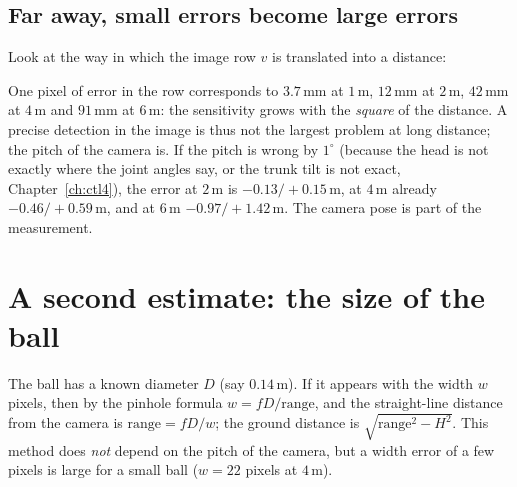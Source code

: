 \subsection*{Far away, small errors become large errors}
Look at the way in which the image row $v$ is translated into a distance:
\begin{center}
\end{center}
One pixel of error in the row corresponds to $3.7$\,mm at $1$\,m, $12$\,mm at $2$\,m, $42$\,mm at $4$\,m and $91$\,mm at $6$\,m: the sensitivity grows with the \emph{square} of the distance. A precise detection in the image is thus not the largest problem at long distance; the pitch of the camera is. If the pitch is wrong by $1^{\circ}$ (because the head is not exactly where the joint angles say, or the trunk tilt is not exact, Chapter~\ref{ch:ctl4}), the error at $2$\,m is $-0.13/+0.15$\,m, at $4$\,m already $-0.46/+0.59$\,m, and at $6$\,m $-0.97/+1.42$\,m. The camera pose is part of the measurement.

\section*{A second estimate: the size of the ball}
The ball has a known diameter $D$ (say $0.14$\,m). If it appears with the width $w$ pixels, then by the pinhole formula $w=fD/\text{range}$, and the straight-line distance from the camera is $\text{range}=fD/w$; the ground distance is $\sqrt{\text{range}^2-H^2}$. This method does \emph{not} depend on the pitch of the camera, but a width error of a few pixels is large for a small ball ($w=22$ pixels at $4$\,m).

